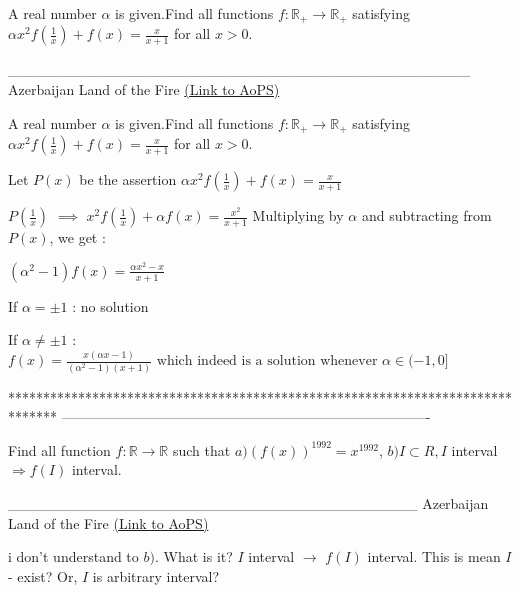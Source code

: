 \begin{problem}
	A real number $\alpha$ is given.Find all functions $f: \mathbb{R_+}\to\mathbb{R_+}$ satisfying ${\alpha}x^2f(\frac{1}{x})+f(x)=\frac{x}{x+1}$ for all $x>0$.

____________________________________________
Azerbaijan Land of the Fire 
	\flushright \href{https://artofproblemsolving.com/community/c6h531223}{(Link to AoPS)}
\end{problem}



\begin{solution}
	\begin{tcolorbox}A real number $\alpha$ is given.Find all functions $f: \mathbb{R_+}\to\mathbb{R_+}$ satisfying ${\alpha}x^2f(\frac{1}{x})+f(x)=\frac{x}{x+1}$ for all $x>0$.\end{tcolorbox}
Let $P(x)$ be the assertion $\alpha x^2f(\frac 1x)+f(x)=\frac x{x+1}$

$P(\frac 1x)$ $\implies$ $x^2f(\frac 1x)+\alpha f(x)=\frac {x^2}{x+1}$
Multiplying by $\alpha$ and subtracting from $P(x)$, we get :

$(\alpha^2-1) f(x)=\frac {\alpha x^2-x}{x+1}$

If $\alpha=\pm 1$ : no solution

If $\alpha\ne \pm 1$ : $\boxed{f(x)=\frac {x(\alpha x-1)}{(\alpha^2-1) (x+1)}\text{  which indeed is a solution whenever }\alpha\in(-1,0]}$
\end{solution}
*******************************************************************************
-------------------------------------------------------------------------------

\begin{problem}
	Find all function $f: \mathbb{R}\to\mathbb{R}$ such that $a)(f(x))^{1992}=x^{1992}$, $b)I{\subset}R,I$ interval ${\Rightarrow}f(I)$ interval.

_______________________________________
Azerbaijan Land of the Fire 
	\flushright \href{https://artofproblemsolving.com/community/c6h531246}{(Link to AoPS)}
\end{problem}



\begin{solution}
	i don't understand to $b).$
What is it? 
$I$ interval $ \rightarrow $  $f(I)$ interval.
This is mean  $I$ - exist? 
Or,  $I$ is arbitrary interval?
\end{solution}



